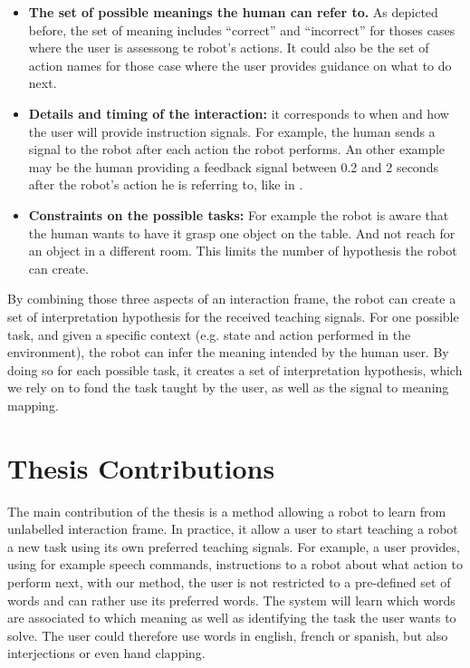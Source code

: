 \begin{itemize}

\item \textbf{The set of possible meanings the human can refer to.} As depicted before, the set of meaning includes ``correct'' and ``incorrect'' for thoses cases where the user is assessong te robot's actions. It could also be the set of action names for those case where the user provides guidance on what to do next.

\item \textbf{Details and timing of the interaction:} it corresponds to when and how the user will provide instruction signals. For example, the human sends a signal to the robot after each action the robot performs. An other example may be the human providing a feedback signal between 0.2 and 2 seconds after the robot's action he is referring to, like in \cite{knox2009interactively}.

\item \textbf{Constraints on the possible tasks:} For example the robot is aware that the human wants to have it grasp one object on the table. And not reach for an object in a different room. This limits the number of hypothesis the robot can create.

\end{itemize}

By combining those three aspects of an interaction frame, the robot can create a set of interpretation hypothesis for the received teaching signals. For one possible task, and given a specific context (e.g. state and action performed in the environment), the robot can infer the meaning intended by the human user. By doing so for each possible task, it creates a set of interpretation hypothesis, which we rely on to fond the task taught by the user, as well as the signal to meaning mapping.


\section{Thesis Contributions}

The main contribution of the thesis is a method allowing a robot to learn from unlabelled interaction frame. In practice, it allow a user to start teaching a robot a new task using its own preferred teaching signals. For example, a user provides, using for example speech commands, instructions to a robot about what action to perform next, with our method, the user is not restricted to a pre-defined set of words and can rather use its preferred words. The system will learn which words are associated to which meaning as well as identifying the task the user wants to solve. The user could therefore use words in english, french or spanish, but also interjections or even hand clapping.

